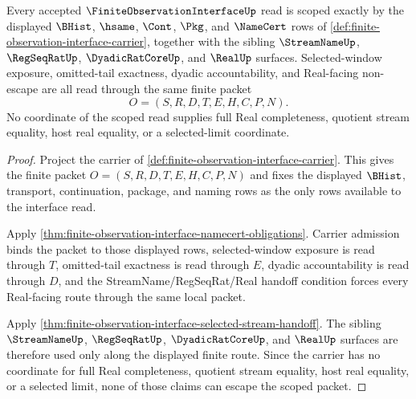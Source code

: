 \begin{theorem}
\label{thm:finite-observation-interface-scoped-closure}
Every accepted $\FiniteObservationInterfaceUp$ read is scoped exactly by the displayed $\BHist$, $\hsame$, $\Cont$, $\Pkg$, and $\NameCert$ rows of \autoref{def:finite-observation-interface-carrier}, together with the sibling $\StreamNameUp$, $\RegSeqRatUp$, $\DyadicRatCoreUp$, and $\RealUp$ surfaces. Selected-window exposure, omitted-tail exactness, dyadic accountability, and Real-facing non-escape are all read through the same finite packet
$$
O=(S,R,D,T,E,H,C,P,N).
$$
No coordinate of the scoped read supplies full Real completeness, quotient stream equality, host real equality, or a selected-limit coordinate.
\end{theorem}
\begin{proof}
Project the carrier of \autoref{def:finite-observation-interface-carrier}. This gives the finite packet $O=(S,R,D,T,E,H,C,P,N)$ and fixes the displayed $\BHist$, transport, continuation, package, and naming rows as the only rows available to the interface read.

Apply \autoref{thm:finite-observation-interface-namecert-obligations}. Carrier admission binds the packet to those displayed rows, selected-window exposure is read through $T$, omitted-tail exactness is read through $E$, dyadic accountability is read through $D$, and the StreamName/RegSeqRat/Real handoff condition forces every Real-facing route through the same local packet.

Apply \autoref{thm:finite-observation-interface-selected-stream-handoff}. The sibling $\StreamNameUp$, $\RegSeqRatUp$, $\DyadicRatCoreUp$, and $\RealUp$ surfaces are therefore used only along the displayed finite route. Since the carrier has no coordinate for full Real completeness, quotient stream equality, host real equality, or a selected limit, none of those claims can escape the scoped packet.
\end{proof}

